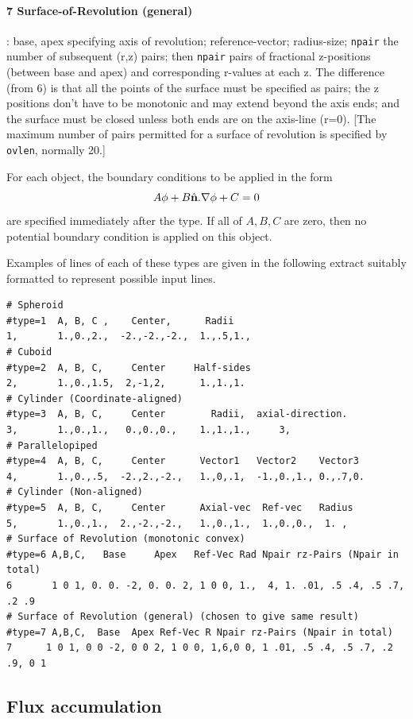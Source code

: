\documentclass[12pt]{article}
\begin{document}
\paragraph{7 Surface-of-Revolution (general)}: base, apex specifying
axis of revolution; reference-vector; radius-size; \verb!npair! the
number of subsequent (r,z) pairs; then \verb!npair! pairs of
fractional z-positions (between base and apex) and corresponding
r-values at each z. The difference (from 6) is that all the points of the
surface must be specified as pairs; the z positions don't have to be
monotonic and may extend beyond the axis ends; and the surface must be
closed unless both ends are on the axis-line (r=0). [The maximum number
of pairs permitted for a surface of revolution is specified by
\verb!ovlen!, normally 20.]

\bigskip
For each object, the boundary conditions to be applied in the form 
$$A\phi + B \hat{\bf n}.\nabla\phi + C =0$$
are specified immediately after the type. If all of $A,B,C$ are zero,
then no potential boundary condition is applied on this object.

Examples of lines of each of these types are given in the following
extract suitably formatted to represent possible input lines.

\begin{verbatim}
# Spheroid
#type=1  A, B, C ,    Center,      Radii
1,       1.,0.,2.,  -2.,-2.,-2.,  1.,.5,1., 
# Cuboid
#type=2  A, B, C,     Center     Half-sides
2,       1.,0.,1.5,  2,-1,2,      1.,1.,1.
# Cylinder (Coordinate-aligned)
#type=3  A, B, C,     Center        Radii,  axial-direction. 
3,       1.,0.,1.,   0.,0.,0.,    1.,1.,1.,     3,
# Parallelopiped
#type=4  A, B, C,     Center      Vector1   Vector2    Vector3
4,       1.,0.,.5,  -2.,2.,-2.,   1.,0,.1,  -1.,0.,1., 0.,.7,0.
# Cylinder (Non-aligned)
#type=5  A, B, C,     Center      Axial-vec  Ref-vec   Radius
5,       1.,0.,1.,  2.,-2.,-2.,   1.,0.,1.,  1.,0.,0.,  1. ,
# Surface of Revolution (monotonic convex)
#type=6 A,B,C,   Base     Apex   Ref-Vec Rad Npair rz-Pairs (Npair in total)
6       1 0 1, 0. 0. -2, 0. 0. 2, 1 0 0, 1.,  4, 1. .01, .5 .4, .5 .7, .2 .9
# Surface of Revolution (general) (chosen to give same result)
#type=7 A,B,C,  Base  Apex Ref-Vec R Npair rz-Pairs (Npair in total)
7      1 0 1, 0 0 -2, 0 0 2, 1 0 0, 1,6,0 0, 1 .01, .5 .4, .5 .7, .2 .9, 0 1

\end{verbatim}

\subsection{Flux accumulation}
\end{document}
